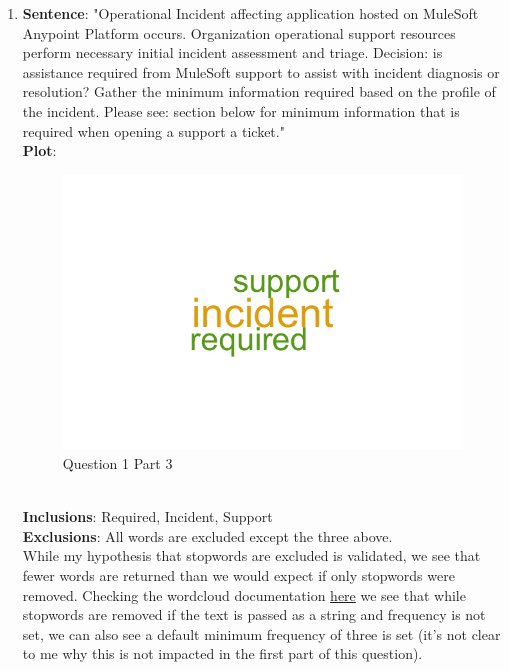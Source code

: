 \documentclass{article}
\begin{document}
\begin{enumerate}
	\item \textbf{Sentence}: "Operational Incident affecting application hosted on MuleSoft Anypoint Platform occurs.
	Organization operational support resources perform necessary initial incident assessment and triage.
	Decision: is assistance required from MuleSoft support to assist with incident diagnosis or resolution?
	Gather the minimum information required based on the profile of the incident. Please see: section below for minimum information that is required when opening a support a ticket." 
	\\
	\textbf{Plot}:
	\begin{figure}[h!]
		\centering
		\includegraphics[width=0.3\linewidth]{q1e2.png}
		\caption{Question 1 Part 3}
	\end{figure}
	\\
	\textbf{Inclusions}: Required, Incident, Support
	\\ 
	\textbf{Exclusions}: All words are excluded except the three above.
	\\
	While my hypothesis that stopwords are excluded is validated, we see that fewer words are returned than we would expect if only stopwords were removed. Checking the wordcloud documentation \href{https://www.rdocumentation.org/packages/wordcloud/versions/2.6/topics/wordcloud}{here} we see that while stopwords are removed if the text is passed as a string and frequency is not set, we can also see a default minimum frequency of three is set (it's not clear to me why this is not impacted in the first part of this question).\\
	

\end{enumerate}
\end{document}
